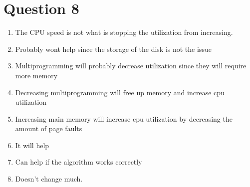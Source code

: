 \documentclass{article}
\begin{document}
\section*{Question 8}
\begin{enumerate}
    \item The CPU speed is not what is stopping the utilization from increasing.
    \item Probably wont help since the storage of the disk is not the issue
    \item Multiprogramming will probably decrease utilization since they will require more memory
    \item Decreasing multiprogramming will free up memory and increase cpu utilization
    \item Increasing main memory will increase cpu utilization by decreasing the amount of page faults 
    \item It will help
    \item Can help if the algorithm works correctly
    \item Doesn't change much.
\end{enumerate}
\end{document}
